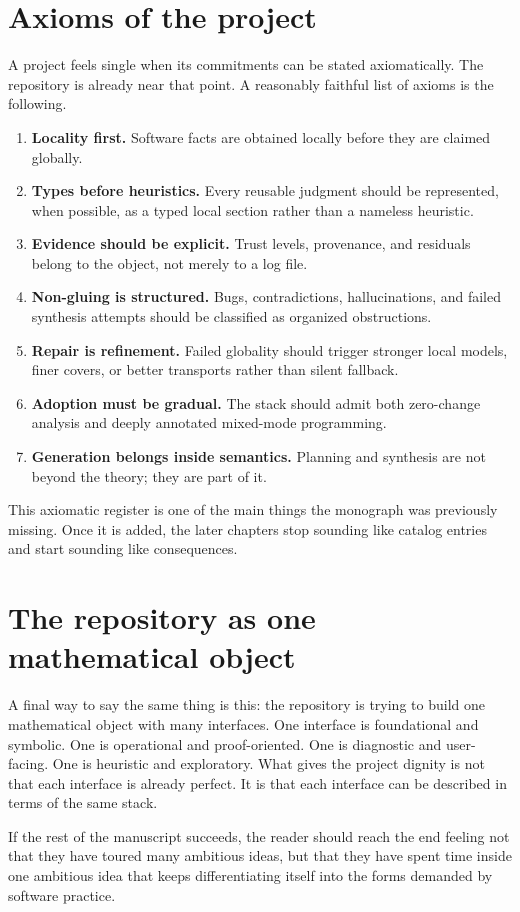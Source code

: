 \section*{Axioms of the project}
A project feels single when its commitments can be stated axiomatically. The repository is
already near that point. A reasonably faithful list of axioms is the following.
\begin{enumerate}[leftmargin=2em, itemsep=0.4em]
  \item \textbf{Locality first.} Software facts are obtained locally before they are claimed
  globally.
  \item \textbf{Types before heuristics.} Every reusable judgment should be represented, when
  possible, as a typed local section rather than a nameless heuristic.
  \item \textbf{Evidence should be explicit.} Trust levels, provenance, and residuals belong
  to the object, not merely to a log file.
  \item \textbf{Non-gluing is structured.} Bugs, contradictions, hallucinations, and failed
  synthesis attempts should be classified as organized obstructions.
  \item \textbf{Repair is refinement.} Failed globality should trigger stronger local models,
  finer covers, or better transports rather than silent fallback.
  \item \textbf{Adoption must be gradual.} The stack should admit both zero-change analysis and
  deeply annotated mixed-mode programming.
  \item \textbf{Generation belongs inside semantics.} Planning and synthesis are not beyond the
  theory; they are part of it.
\end{enumerate}

This axiomatic register is one of the main things the monograph was previously missing. Once
it is added, the later chapters stop sounding like catalog entries and start sounding like
consequences.

\section*{The repository as one mathematical object}
A final way to say the same thing is this: the repository is trying to build one mathematical
object with many interfaces. One interface is foundational and symbolic. One is operational
and proof-oriented. One is diagnostic and user-facing. One is heuristic and exploratory.
What gives the project dignity is not that each interface is already perfect. It is that each
interface can be described in terms of the same stack.

If the rest of the manuscript succeeds, the reader should reach the end feeling not that they
have toured many ambitious ideas, but that they have spent time inside one ambitious idea
that keeps differentiating itself into the forms demanded by software practice.
